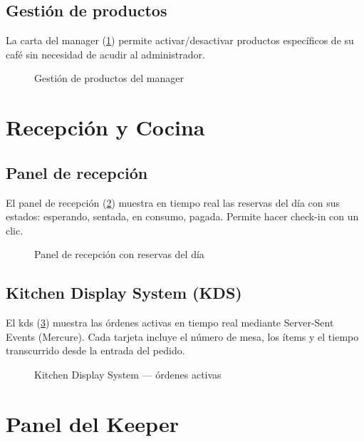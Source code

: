 \documentclass[12pt,a4paper,twoside,openright]{report}
\begin{document}
\subsection{Gestión de productos}
La carta del manager (\cref{fig:50-manager-productos}) permite activar/desactivar
productos específicos de su café sin necesidad de acudir al administrador.

\begin{figure}[H]
  \centering
  \fbox{\rule{0pt}{6cm}\rule{12cm}{0pt}}
  \caption{Gestión de productos del manager}
  \label{fig:50-manager-productos}
\end{figure}

\section{Recepción y Cocina}
\label{sec:manual-ops}

\subsection{Panel de recepción}
El panel de recepción (\cref{fig:54-reception-dashboard}) muestra en tiempo real
las reservas del día con sus estados: esperando, sentada, en consumo, pagada.
Permite hacer check-in con un clic.

\begin{figure}[H]
  \centering
  \fbox{\rule{0pt}{6cm}\rule{12cm}{0pt}}
  \caption{Panel de recepción con reservas del día}
  \label{fig:54-reception-dashboard}
\end{figure}

\subsection{Kitchen Display System (KDS)}
El \gls{kds} (\cref{fig:56-kitchen-orders}) muestra las órdenes activas en tiempo
real mediante Server-Sent Events (Mercure). Cada tarjeta incluye el número de mesa,
los ítems y el tiempo transcurrido desde la entrada del pedido.

\begin{figure}[H]
  \centering
  \fbox{\rule{0pt}{6cm}\rule{12cm}{0pt}}
  \caption{Kitchen Display System — órdenes activas}
  \label{fig:56-kitchen-orders}
\end{figure}

\section{Panel del Keeper}
\label{sec:manual-keeper}
\end{document}
